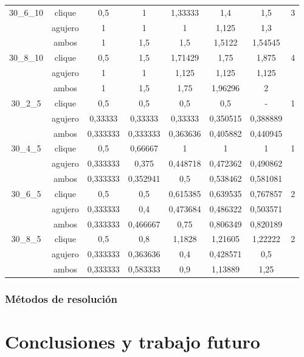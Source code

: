 \documentclass[a4paper]{article}
\begin{document}
\begin{longtable}[!htb]
\begin{center}
\begin{tabular}{|c|c|c|c|c|c|c|c|}
\hline
30_6_10&clique&0,5&1&1,33333&1,4&1,5&3\\
\cline{2-7}
&agujero&1&1&1&1,125&1,3&\\
\cline{2-7}
&ambos&1&1,5&1,5&1,5122&1,54545&\\
\hline
30_8_10&clique&0,5&1,5&1,71429&1,75&1,875&4\\
\cline{2-7}
&agujero&1&1&1,125&1,125&1,125&\\
\cline{2-7}
&ambos&1&1,5&1,75&1,96296&2&\\
\hline
30_2_5&clique&0,5&0,5&0,5&0,5&-&1\\
\cline{2-7}
&agujero&0,33333&0,33333&0,33333&0,350515&0,388889&\\
\cline{2-7}
&ambos&0,333333&0,333333&0,363636&0,405882&0,440945&\\
\hline
30_4_5&clique&0,5&0,66667&1&1&1&1\\
\cline{2-7}
&agujero&0,333333&0,375&0,448718&0,472362&0,490862&\\
\cline{2-7}
&ambos&0,333333&0,352941&0,5&0,538462&0,581081&\\
\hline
30_6_5&clique&0,5&0,5&0,615385&0,639535&0,767857&2\\
\cline{2-7}
&agujero&0,333333&0,4&0,473684&0,486322&0,503571&\\
\cline{2-7}
&ambos&0,333333&0,466667&0,75&0,806349&0,820189&\\
\hline
30_8_5&clique&0,5&0,8&1,1828&1,21605&1,22222&2\\
\cline{2-7}
&agujero&0,333333&0,363636&0,4&0,428571&0,5&\\
\cline{2-7}
&ambos&0,333333&0,583333&0,9&1,13889&1,25&\\
\hline
\end{tabular}
\end{center}
\end{longtable}

\subsubsection{Métodos de resolución}

\newpage

\section{Conclusiones y trabajo futuro} 
\end{document}
